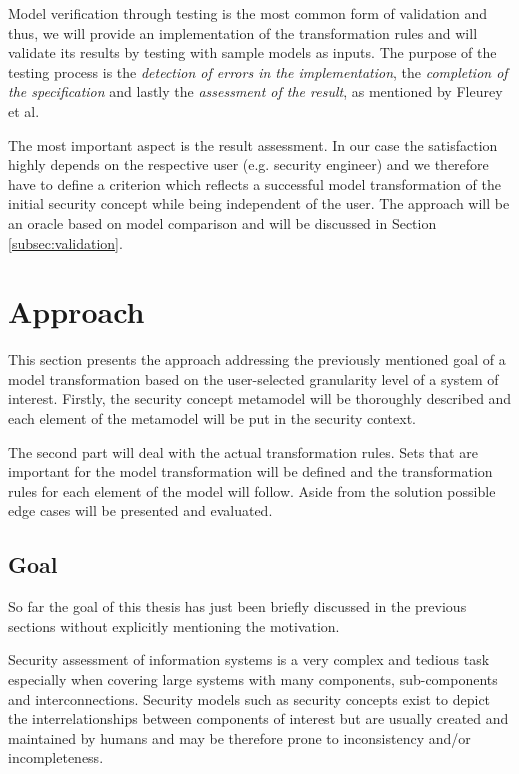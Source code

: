 Model verification through testing is the most common form of validation \cite{fleurey} and thus, we will provide an implementation of the transformation rules and will validate its results by testing with sample models as inputs. The purpose of the testing process is the \textit{detection of errors in the implementation}, the \textit{completion of the specification} and lastly the \textit{assessment of the result}, as mentioned by Fleurey et al.

The most important aspect is the result assessment. In our case the satisfaction highly depends on the respective user (e.g. security engineer) and we therefore have to define a criterion which reflects a successful model transformation of the initial security concept while being independent of the user. The approach will be an oracle based on model comparison and will be discussed in Section \ref{subsec:validation}.
 
\section{Approach}
\label{sec:approach}

This section presents the approach addressing the previously mentioned goal of a model transformation based on the user-selected granularity level of a system of interest. Firstly, the security concept metamodel will be thoroughly described and each element of the metamodel will be put in the security context.

The second part will deal with the actual transformation rules. Sets that are important for the model transformation will be defined and the transformation rules for each element of the model will follow. Aside from the solution possible edge cases will be presented and evaluated.

\subsection{Goal}

So far the goal of this thesis has just been briefly discussed in the previous sections without explicitly mentioning the motivation. 

Security assessment of information systems is a very complex and tedious task especially when covering large systems with many components, sub-components and interconnections. Security models such as security concepts exist to depict the interrelationships between components of interest but are usually created and maintained by humans and may be therefore prone to inconsistency and/or incompleteness.

